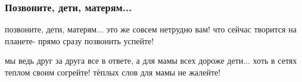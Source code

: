  
 
 

\subsubsection{Позвоните, дети, матерям...}
\label{sec:poetry.rus.taisia_vakulenko.deti_materi}

позвоните, дети, матерям...
это же совсем нетрудно вам!
что сейчас творится на планете-
прямо сразу позвонить успейте!

мы ведь друг за друга все в ответе,
а для мамы всех дороже дети...
хоть в сетях теплом своим согрейте!
тёплых слов для мамы не жалейте!
